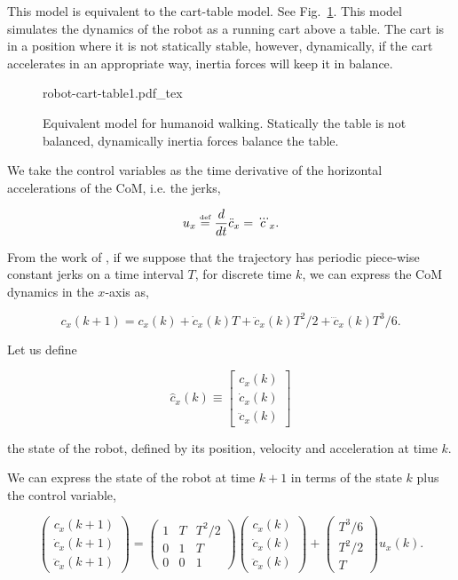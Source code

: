 This model is equivalent to the cart-table model. See Fig.~\ref{Fig:Inverted-Pendulum-Cart-Table}. This model simulates the dynamics of the robot as a running cart above a table. The cart is in a position where it is not statically stable, however, dynamically, if the cart accelerates in an appropriate way, inertia forces will keep it in balance.

\begin{figure}
  \centering
      {\def\svgwidth{0.5\columnwidth}
        
                   {robot-cart-table1.pdf_tex}}
      \caption[]{Equivalent model for humanoid walking. Statically the table is not balanced, dynamically inertia forces balance the table.}
      \label{Fig:Inverted-Pendulum-Cart-Table}
\end{figure}

We take the control variables as the time derivative of the horizontal accelerations of the CoM, i.e. the jerks,

$$
 u_x \stackrel{\mbox{\tiny def}}{=} \dfrac{d}{dt}\ddot{c}_x = \dddot{c}_x.
$$

From the  work of \citep{Kajita2003}, if we suppose that the trajectory has periodic piece-wise constant jerks on a time interval $T$, for discrete time $k$, we can express the CoM dynamics in the $x$-axis as,

$$
c_x(k+1) = c_x(k) + \dot{c}_x(k) T + \ddot{c}_x(k) T^2/2 + \dddot{c}_x(k) T^3/6.
$$

Let us define

$$
\hat{c}_x(k) \equiv 
\left[
\begin{matrix}
c_x(k) \\ 
\dot{c}_x(k)\\
\ddot{c}_x(k) 
\end{matrix}
\right]
$$ 

\noindent the state of the robot, defined by its position, velocity and acceleration at time $k$. 

We can express the state of the robot at time $k+1$ in terms of the state $k$ plus the control variable,

\begin{equation}
\label{Eq:state_dynamics}
\left(
\begin{matrix}
c_x(k+1) \\ 
\dot{c}_x(k+1)\\
\ddot{c}_x(k+1) 
\end{matrix}
\right) =
\left(
\begin{matrix}
1 & T & T^2/2 \\
0 & 1 & T \\
0 & 0 & 1
\end{matrix}
\right)
\left(
\begin{matrix}
c_x(k) \\ 
\dot{c}_x(k)\\
\ddot{c}_x(k) 
\end{matrix}
\right) +
\left(
\begin{matrix}
T^3/6 \\
T^2/2 \\
T
\end{matrix}
\right)
u_x(k).
\end{equation}

